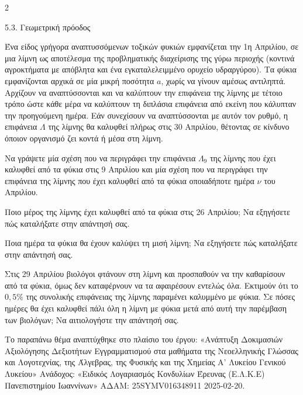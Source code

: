 \begin{ylh}{2}
    \item 5.3. Γεωμετρική πρόοδος
\end{ylh}
Ένα είδος γρήγορα αναπτυσσόμενων τοξικών φυκιών εμφανίζεται την 1η Απριλίου, σε μια λίμνη ως αποτέλεσμα της προβληματικής διαχείρισης της γύρω περιοχής (κοντινά αγροκτήματα με απόβλητα και ένα εγκαταλελειμμένο ορυχείο υδραργύρου). Τα φύκια εμφανίζονται αρχικά σε μία μικρή ποσότητα $a$, χωρίς να γίνουν αμέσως αντιληπτά. Αρχίζουν να αναπτύσσονται και να καλύπτουν την επιφάνεια της λίμνης με τέτοιο τρόπο ώστε κάθε μέρα να καλύπτουν τη διπλάσια επιφάνεια από εκείνη που κάλυπταν την προηγούμενη ημέρα. Εάν συνεχίσουν να αναπτύσσονται με αυτόν τον ρυθμό, η επιφάνεια $\Lambda$ της λίμνης θα καλυφθεί πλήρως στις 30 Απριλίου, θέτοντας σε κίνδυνο όποιον οργανισμό ζει κοντά ή μέσα στη λίμνη.

\begin{alist}
\item Να γράψετε μία σχέση που να περιγράφει την επιφάνεια $\Lambda_{9}$ της λίμνης που έχει καλυφθεί από τα φύκια στις 9 Απριλίου και μία σχέση που να περιγράφει την επιφάνεια της λίμνης που έχει καλυφθεί από τα φύκια οποιαδήποτε ημέρα $\nu$ του Απριλίου.
\item Ποιο μέρος της λίμνης έχει καλυφθεί από τα φύκια στις 26 Απριλίου; Να εξηγήσετε πώς καταλήξατε στην απάντησή σας.
\item Ποια ημέρα τα φύκια θα έχουν καλύψει τη μισή λίμνη; Να εξηγήσετε πώς καταλήξατε στην απάντησή σας.
\item Στις 29 Απριλίου βιολόγοι φτάνουν στη λίμνη και προσπαθούν να την καθαρίσουν από τα φύκια, όμως δεν καταφέρνουν να τα αφαιρέσουν εντελώς όλα. Εκτιμούν ότι το 0$,5\%$ της συνολικής επιφάνειας της λίμνης παραμένει καλυμμένο με φύκια. Σε πόσες ημέρες θα έχει καλυφθεί πάλι όλη η λίμνη με φύκια μετά από αυτή την παρέμβαση των βιολόγων; Να αιτιολογήστε την απάντησή σας.

{\footnotesize Το παραπάνω θέμα αναπτύχθηκε στο πλαίσιο του έργου: «Ανάπτυξη Δοκιμασιών Αξιολόγησης Δεξιοτήτων Εγγραμματισμού στα μαθήματα της Νεοελληνικής Γλώσσας και Λογοτεχνίας, της Άλγεβρας, της Φυσικής και της Χημείας Α' Λυκείου Γενικού Λυκείου» Ανάδοχος: «Ειδικός Λογαριασμός Κονδυλίων Έρευνας (Ε.Λ.Κ.Ε) Πανεπιστημίου Ιωαννίνων» ΑΔΑΜ: 25SYMV016348911 2025-02-20.}
\end{alist}

